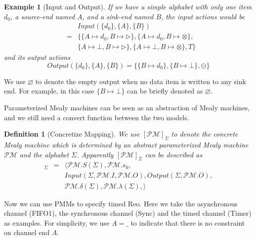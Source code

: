 \documentclass[conference, a4paper]{IEEEtran}
\newtheorem{definition}{Definition}
\newtheorem{example}{Example}
\newcommand{\rblock}[0]{\circleddash}
\newcommand{\rread}[0]{\rhd}
\newcommand{\rnoread}[0]{\otimes}
\newcommand{\smap}[1]{[{#1}]}
\newcommand{\rempty}[0]{\varnothing}
\begin{document}
\begin{example}[Input and Output]
  If we have a simple alphabet with only one item $d_0$, a source-end named $A$, and a
  sink-end named $B$, the input actions would be
  \begin{eqnarray*}
    & & Input(\{d_0\},\{A\},\{B\}) \\
    & = & \{\{A\mapsto d_0,B\mapsto\rread\},\{A\mapsto d_0,B\mapsto\rnoread\}, \\
    & & \{A\mapsto\bot,B\mapsto\rread\}, \{A\mapsto\bot,B\mapsto\rnoread\},T\}
  \end{eqnarray*}
  and its output actions
  \[
  Output(\{d_0\},\{A\},\{B\}) =\{\{B\mapsto d_0\},\{B\mapsto \bot\}, \rblock\}
  \]
\end{example}

We use $\varnothing$ to denote the empty output when no data item is written to any sink end.
For example, in this case $\{B\mapsto\bot\}$ can be briefly denoted as $\rempty$.

Parameterized Mealy machines can be seen as an abstraction of Mealy machines, and we
still need a convert function between the two models.

\begin{definition}[Concretize Mapping]
  We use $\smap{\mathcal{PM}}_{\Sigma}$ to denote the concrete Mealy machine which is determined by
  an abstract parameterized Mealy machine $\mathcal{PM}$ and the alphabet $\Sigma$. Apparently
  $\smap{\mathcal{PM}}_{\Sigma}$ can be described as
  \begin{eqnarray*}
    \smap{\mathcal{PM}}_{\Sigma} &=& 
    \langle
    \mathcal{PM}.S(\Sigma), \mathcal{PM}.s_0, \\
    & & Input(\Sigma, \mathcal{PM}.I, \mathcal{PM}.O), Output(\Sigma, \mathcal{PM}.O), \\
    & & \mathcal{PM}.\delta(\Sigma), \mathcal{PM}.\lambda(\Sigma),
    \rangle
  \end{eqnarray*}
\end{definition}

Now we can use PMMs to specify timed Reo. Here we take the asynchronous channel (FIFO1), the
synchronous channel (Sync) and the timed channel (Timer) as examples. For simplicity, we use $A=\_$
to indicate that there is no constraint on channel end $A$.
\end{document}

